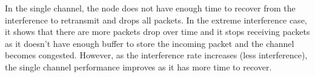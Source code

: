 In the single channel, the node does not have enough time to recover from the interference to retransmit and drops all packets. In the extreme interference case, it shows that there are more packets drop over time and it stops receiving packets as it doesn't have enough buffer to store the incoming packet and the channel becomes congested. However, as the interference rate increases (less interference), the single channel performance improves as it has more time to recover.





